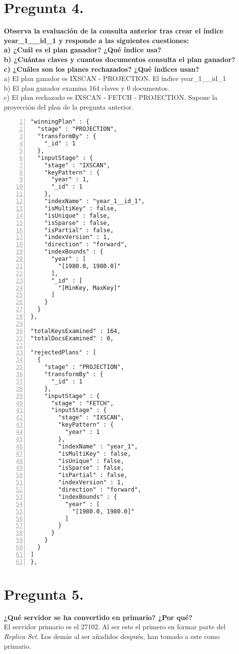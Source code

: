 \documentclass{article}
\begin{document}
  \section{Pregunta 4.}
  \textbf{Observa la evaluación de la consulta anterior tras crear el índice year\_1\_\_id\_1 y responde a las siguientes cuestiones: \\
     a) ¿Cuál es el plan ganador? ¿Qué índice usa? \\
     b) ¿Cuántas claves y cuantos documentos consulta el plan ganador? \\
     c) ¿Cuáles son los planes rechazados? ¿Qué índices usan? \\}
   a) El plan ganador es IXSCAN - PROJECTION. El índice year\_1\_\_id\_1\\
   b) El plan ganador examina 164 claves y 0 documentos. \\
   c) El plan rechazado es IXSCAN - FETCH - PROJECTION. Supone la proyección del plan de la pregunta anterior. 
    \begin{lstlisting}[numbers=left,frame=single]
"winningPlan" : {
  "stage" : "PROJECTION",
  "transformBy" : {
    "_id" : 1
  },
  "inputStage" : {
    "stage" : "IXSCAN",
    "keyPattern" : {
      "year" : 1,
      "_id" : 1
    },
    "indexName" : "year_1__id_1",
    "isMultiKey" : false,
    "isUnique" : false,
    "isSparse" : false,
    "isPartial" : false,
    "indexVersion" : 1,
    "direction" : "forward",
    "indexBounds" : {
      "year" : [
        "[1980.0, 1980.0]"
      ],
      "_id" : [
        "[MinKey, MaxKey]"
      ]
    }
  }
},

"totalKeysExamined" : 164,
"totalDocsExamined" : 0,

"rejectedPlans" : [
  {
    "stage" : "PROJECTION",
    "transformBy" : {
      "_id" : 1
    },
    "inputStage" : {
      "stage" : "FETCH",
      "inputStage" : {
        "stage" : "IXSCAN",
        "keyPattern" : {
          "year" : 1
        },
        "indexName" : "year_1",
        "isMultiKey" : false,
        "isUnique" : false,
        "isSparse" : false,
        "isPartial" : false,
        "indexVersion" : 1,
        "direction" : "forward",
        "indexBounds" : {
          "year" : [
            "[1980.0, 1980.0]"
          ]
        }
      }
    }
  }
]
},
    \end{lstlisting}
  \newpage
  \section{Pregunta 5.}
  \textbf{¿Qué servidor se ha convertido en primario? ¿Por qué? \\}
    El servidor primario es el 27102. Al ser este el primero en formar parte
    del \emph{Replica Set}. Los demás al ser añadidos después, han tomado a
    este como primario.
\end{document}
